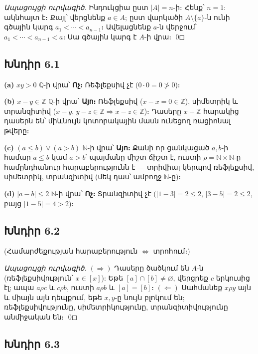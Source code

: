 \emph{Ապացույցի ուրվագիծ.} Ինդուկցիա ըստ $|A|=n$-ի։ Հենք՝ $n=1$: ակնհայտ է։ Քայլ՝ վերցնենք $a\in A$; ըստ վարկածի $A\setminus\{a\}$-ն ունի գծային կարգ $a_1<\cdots<a_{n-1}$։ Ավելացնենք $a$-ն վերջում՝ $a_1<\cdots<a_{n-1}<a$։ Սա գծային կարգ է $A$-ի վրա։ \qed


\subsection*{Խնդիր 6.1}

\textbf{(a)} $xy>0$ $\mathbb{Q}$-ի վրա՝ \textbf{Ոչ։} Ռեֆլեքսիվ չէ ($0\cdot 0=0\not>0$)։

\textbf{(b)} $x-y\in\mathbb{Z}$ $\mathbb{Q}$-ի վրա՝ \textbf{Այո։} Ռեֆլեքսիվ ($x-x=0\in\mathbb{Z}$), սիմետրիկ և տրանզիտիվ ($x-y,\,y-z\in\mathbb{Z}\Rightarrow x-z\in\mathbb{Z}$)։ Դասերը $x+\mathbb{Z}$ հարակից դասերն են՝ միևնույն կոտորակային մասն ունեցող ռացիոնալ թվերը։

\textbf{(c)} $(a\le b)\lor(a>b)$ $\mathbb{N}$-ի վրա՝ \textbf{Այո։} Քանի որ ցանկացած $a,b$-ի համար $a\le b$ կամ $a>b$՝ պայմանը միշտ ճիշտ է, ուստի $\rho=\mathbb{N}\times\mathbb{N}$-ը համընդհանուր հարաբերությունն է — տրիվիալ կերպով ռեֆլեքսիվ, սիմետրիկ, տրանզիտիվ (մեկ դաս՝ ամբողջ $\mathbb{N}$-ը)։

\textbf{(d)} $|a-b|\le 2$ $\mathbb{N}$-ի վրա՝ \textbf{Ոչ։} Տրանզիտիվ չէ ($|1-3|=2\le 2$, $|3-5|=2\le 2$, բայց $|1-5|=4>2$)։


\subsection*{Խնդիր 6.2}

(Համարժեքության հարաբերություն $\Leftrightarrow$ տրոհում։)

\emph{Ապացույցի ուրվագիծ.}
$(\Rightarrow)$ Դասերը ծածկում են $A$-ն (ռեֆլեքսիվություն՝ $x\in[x]$): Եթե $[a]\cap[b]\ne\varnothing$, վերցրեք $c$ երկուսից էլ; ապա $a\rho c$ և $c\rho b$, ուստի $a\rho b$ և $[a]=[b]$։
$(\Leftarrow)$ Սահմանեք $x\rho y$ այն և միայն այն դեպքում, եթե $x,y$-ը նույն բլոկում են; ռեֆլեքսիվությունը, սիմետրիկությունը, տրանզիտիվությունը անմիջական են։ \qed


\subsection*{Խնդիր 6.3}

